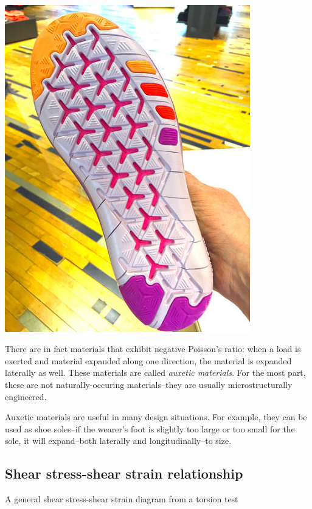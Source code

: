 \documentclass[
fontsize=10pt,
a4paper,
twosides=false,
open=any,
svgnames,
]{kaobook} %
\begin{document}
\begin{marginfigure}
  \centering
  \includegraphics[width=0.8\textwidth]{./pictures/Stress-strain-intro/auxetic-footwear.jpg}
\end{marginfigure}

There are in fact materials that exhibit negative Poisson's ratio: when a load is exerted and material expanded along one direction, the material is expanded laterally as well. These materials are called \emph{auxetic materials}. For the most part, these are not naturally-occuring materials--they are usually microstructurally engineered.

Auxetic materials are useful in many design situations. For example, they can be used as shoe soles--if the wearer's foot is slightly too large or too small for the sole, it will expand--both laterally and longitudinally--to size.

\subsection{Shear stress-shear strain relationship}

\begin{marginfigure}
  \caption{A general shear stress-shear strain diagram from a torsion test}
  \label{fig: shear stress-strain diagram}
\end{marginfigure}
\end{document}
